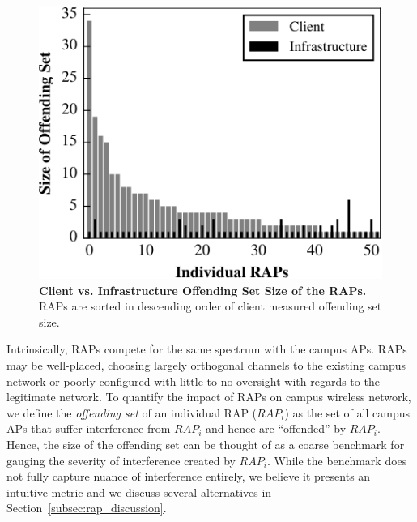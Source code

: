 \begin{figure}[t]
  \centering
  \includegraphics[width=\columnwidth]{./figures/CampusRAPImpact.pdf}
  \caption{\textbf{Client vs. Infrastructure Offending Set Size of
    the RAPs.} RAPs are sorted in descending order of client measured offending
  set size.}
  \label{fig:rap_impact}
  \vspace*{\aftercaptiongap}
\end{figure}

Intrinsically, RAPs compete for the same spectrum with the campus APs. RAPs may be
well-placed, choosing largely orthogonal channels to the existing campus network or
poorly configured with little to no oversight with regards to the legitimate network.  
To quantify the impact of RAPs on campus wireless network, we define the 
\textit{offending set} of an individual RAP ($RAP_i$) as the set of all campus APs 
that suffer interference from $RAP_i$ and hence are
``offended'' by $RAP_i$.  Hence, the size of the offending 
set can be thought of as a coarse benchmark for gauging the severity of interference
created by $RAP_i$.  While the benchmark does not fully capture nuance of interference
entirely, we believe it presents an intuitive metric and we discuss several alternatives
in Section~\ref{subsec:rap_discussion}.
   

